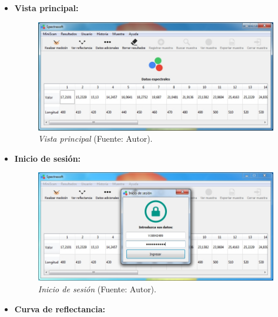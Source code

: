  \begin{itemize}
 	
 	\item \textbf{Vista principal:}
 	
 		\begin{figure}[H]
		\centering
		\includegraphics[scale=0.6]{img/vista-principal.jpg}
			\caption[Vista principal]{\textit{Vista principal} (Fuente: Autor).}
	\end{figure}
	
	 	\item \textbf{Inicio de sesi\'{o}n:}
 	
 		\begin{figure}[H]
		\centering
		\includegraphics[scale=0.6]{img/vista-inicio-sesion.jpg}
			\caption[Inicio de sesi\'{o}n]{\textit{Inicio de sesi\'{o}n} (Fuente: Autor).}
	\end{figure}

\newpage
	 	\item \textbf{Curva de reflectancia:}
 	

\end{itemize}
